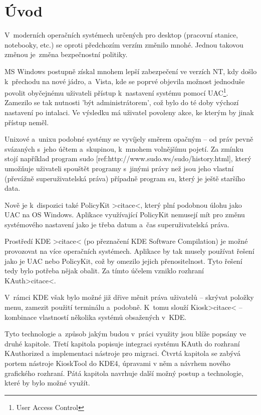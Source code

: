 \chapter{Úvod}
V~moderních operačních systémech určených pro desktop (pracovní stanice,
notebooky, etc.) se oproti předchozím verzím změnilo mnohé. Jednou takovou
změnou je~změna bezpečnostní politiky.

MS Windows postupně získal mnohem lepší zabezpečení ve verzích NT, kdy došlo
k~přechodu na nové jádro, a~Vista, kde se poprvé objevila možnost jednoduše
povolit obyčejnému uživateli přístup k~nastavení systému pomocí UAC\footnote{User Access Control}.
Zamezilo se tak nutnosti 'být administrátorem', což bylo do té doby výchozí
nastavení po intalaci. Ve výsledku má uživatel povoleny akce, ke kterým by jinak
přístup neměl.

Unixové a~unixu podobné systémy se vyvíjely směrem opačným -- od práv pevně
svázaných s~jeho účtem a~skupinou, k~mnohem volnějšímu pojetí. Za zmínku stojí
například program sudo [ref:http://www.sudo.ws/sudo/history.html], který
umožňuje uživateli spouštět programy s~jinými právy než jsou jeho vlastní
(převážně superuživatelská práva) případně program su, který je ještě staršího
data.

Nově je k~dispozici také PolicyKit >citace<, který plní podobnou úlohu jako UAC
na OS Windows. Aplikace využívající PolicyKit nemusejí mít pro změnu systémového
nastavení jako je třeba datum a~čas superuživatelská práva.

Prostředí KDE >citace< (po přeznačení KDE Software Compilation) je možné
provozovat na více operačních systémech. Aplikace by tak musely používat řešení
jako je UAC nebo PolicyKit, což by omezilo jejich přenositelnost. Tyto řešení
tedy bylo potřeba nějak obalit. Za tímto účelem vzniklo rozhraní KAuth>citace<.

V~rámci KDE však bylo možné již dřive měnit práva uživatelů -- skrývat položky
menu, zamezit použití terminálu a~podobně. K~tomu slouží Kiosk>citace<
-- kombinace vlastností několika systémů obsažených v~KDE.

Tyto technologie a~způsob jakým budou v~práci využity jsou blíže popsány ve
druhé kapitole. Třetí kapitola popisuje integraci systému KAuth do rozhraní
KAuthorized a implementaci nástroje pro migraci. Čtvrtá kapitola se zabývá
portem nástroje KioskTool do KDE4, úpravami v něm a návrhem nového grafického
rozhraní. Pátá kapitola navrhuje další možný postup a technologie, které by bylo
možné využít.

